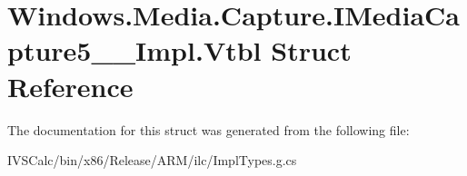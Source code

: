\hypertarget{struct_windows_1_1_media_1_1_capture_1_1_i_media_capture5_____impl_1_1_vtbl}{}\section{Windows.\+Media.\+Capture.\+I\+Media\+Capture5\+\_\+\+\_\+\+Impl.\+Vtbl Struct Reference}
\label{struct_windows_1_1_media_1_1_capture_1_1_i_media_capture5_____impl_1_1_vtbl}


The documentation for this struct was generated from the following file\+:\begin{DoxyCompactItemize}
\item 
I\+V\+S\+Calc/bin/x86/\+Release/\+A\+R\+M/ilc/Impl\+Types.\+g.\+cs\end{DoxyCompactItemize}
